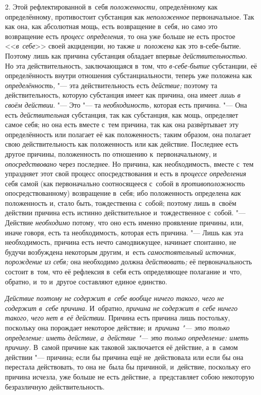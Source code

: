 2. Этой рефлектированной в~себя {\em положенности,}
определённому как определённому, противостоит субстанция как
{\em неположенное} первоначальное. Так как она, как
абсолютная мощь, есть возвращение в~себя, но само это возвращение есть
{\em процесс определения,} то она уже больше не есть
простое <<{\em в~себе}>> своей акциденции, но также
{\em и~положена} как это в-себе-бытие. Поэтому лишь как
причина субстанция обладает впервые
{\em действительностью}. Но эта действительность,
заключающаяся в~том, что {\em в-себе-бытие} субстанции,
её определённость внутри отношения субстанциальности, теперь уже положена
как {\em определённость,} "--- эта действительность есть
{\em действие;} поэтому та действительность, которую
субстанция имеет как причина, она имеет {\em лишь в
своём действии}. "--- Это "--- та {\em необходимость,}
которая есть причина. "--- Она есть {\em действительная}
субстанция, так как субстанция, как мощь, определяет самое себя; но она
есть вместе с~тем причина, так как она развёртывает эту определённость или
полагает её как положенность; таким образом, она полагает свою
действительность как положенность или как действие. Последнее есть другое
причины, положенность по отношению к~первоначальному, и
{\em опосредствовано} через последнее. Но причина, как
необходимость, вместе с~тем упраздняет этот свой процесс опосредствования и
есть в {\em процессе определения} себя самой (как
первоначально соотносящееся с~собой в
{\em противоположность} опосредствованному) возвращение
в~себя; ибо положенность определена {\em как}
положенность и, стало быть, тождественна с~собой; поэтому лишь в~своём
действии причина есть истинно действительное и~тождественное с~собой. "---
Действие {\em необходимо} потому, что оно есть именно
проявление причины, или, иначе говоря, есть та необходимость, которая есть
причина. "--- Лишь как эта необходимость, причина есть нечто самодвижущее,
начинает спонтанно, не будучи возбуждена некоторым другим, и~есть
{\em самостоятельный источник, порождение из себя;} она
необходимо должна {\em действовать;} её
первоначальность состоит в~том, что её рефлексия в~себя есть определяющее
полагание и~что, обратно, и~то и~другое составляют единое единство.

{\em Действие поэтому не содержит в~себе вообще ничего такого, чего не содержит
в~себе причина.} И~обратно, {\em причина не содержит в~себе ничего такого, чего
нет в~её действии}. Причина есть причина лишь постольку, поскольку она
порождает некоторое действие; и~{\em причина "--- это только определение:
иметь действие, а~действие "--- это только определение: иметь причину.}
В~самой причине как таковой заключается её действие, а~в~самом действии "---
причина; если бы причина ещё не~действовала или если бы она перестала
действовать, то она не~была бы причиной, и~действие, поскольку его причина
исчезла, уже больше не есть действие, а~представляет собою некоторую
безразличную действительность.

